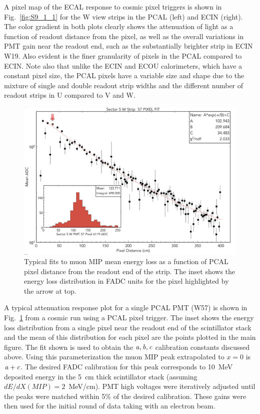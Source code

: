 A pixel map of the ECAL response to cosmic pixel triggers is shown in Fig.~\ref{fig:S9_1_1} for the W view strips in
the PCAL (left) and ECIN (right). The color gradient in both plots clearly shows the attenuation of light as a function
of readout distance from the pixel, as well as the overall variations in PMT gain near the readout end, such as the
substantially brighter strip in ECIN W19. Also evident is the finer granularity of pixels in the PCAL compared to
ECIN. Note also that unlike the ECIN and ECOU calorimeters, which have a constant pixel size, the PCAL pixels have
a variable size and shape due to the mixture of single and double readout strip widths and the different number of
readout strips in U compared to V and W. 
\begin{figure}[hbt]
\centering
\includegraphics[width=1.0\columnwidth,keepaspectratio]{img/S9_1_2.png}
\caption[]{Typical fits to muon MIP mean energy loss as a function of PCAL pixel distance from the readout end of
  the strip. The inset shows the energy loss distribution in FADC units for the pixel highlighted by the arrow at top.}
\label{fig:S9_1_2}
\end{figure}

A typical attenuation response plot for a single PCAL PMT (W57) is shown in Fig.~\ref{fig:S9_1_2} from a cosmic
run using a PCAL pixel trigger. The inset shows the energy loss distribution from a single pixel near the readout
end of the scintillator stack and the mean of this distribution for each pixel are the points plotted in the main figure.
The fit shown is used to obtain the ${\it a,b,c}$ calibration constants discussed above. Using this parameterization
the muon MIP peak extrapolated to $x=0$ is ${\it a+c}$. The desired FADC calibration for this peak corresponds
to 10~MeV deposited energy in the 5~cm thick scintillator stack (assuming $dE/dX(MIP)=2$~MeV/cm). PMT high
voltages were iteratively adjusted until the peaks were matched within 5\% of the desired calibration. These gains
were then used for the initial round of data taking with an electron beam.

